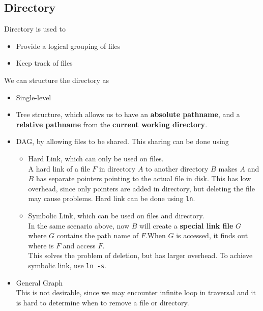\documentclass[12pt]{article}
\theoremstyle{definition}
\begin{document}
\subsection{Directory}
Directory is used to
\begin{itemize}
  \item Provide a logical grouping of files
  \item Keep track of files
\end{itemize} 
We can structure the directory as 
\begin{itemize}
  \item Single-level
  \item Tree structure, which allows us to have an \textbf{absolute pathname}, and a \textbf{relative pathname} from the \textbf{current working directory}.
  \item DAG, by allowing files to be shared. This sharing can be done using
  \begin{itemize}
    \item Hard Link, which can only be used on files.\\
    A hard link of a file $F$ in directory $A$ to another directory $B$ makes $A$ and $B$ has separate pointers pointing to the actual file in disk. This has low overhead, since only pointers are added in directory, but deleting the file may cause problems. Hard link can be done using \texttt{ln}.
    \item Symbolic Link, which can be used on files and directory.\\ 
    In the same scenario above, now $B$ will create a \textbf{special link file} $G$ where $G$ contains the path name of $F$.When $G$ is accessed, it finds out where is $F$ and access $F$.\\
    This solves the problem of deletion, but has larger overhead. To achieve symbolic link, use \texttt{ln -s}.
  \end{itemize}
  \item General Graph\\
  This is not desirable, since we may encounter infinite loop in traversal and it is hard to determine when to remove a file or directory.
\end{itemize}
\end{document}
